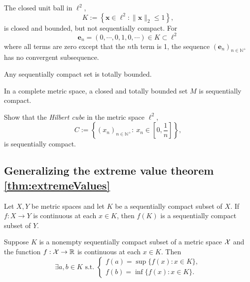 \begin{exm}
  \label{exm:closedBallInEll2}
  The closed unit ball in $\ell^2$, 
  \begin{equation}
    \label{eq:closedBallInEll2}
    K:= \left\{\mathbf{x}\in \ell^2 :
      \|\mathbf{x}\|_2 \le 1 \right\}, 
  \end{equation}
  is closed and bounded, but not sequentially compact.
  For
  \begin{displaymath}
    \mathbf{e}_n = (0,\cdots,0,1,0,\cdots)\in K \subset \ell^2
  \end{displaymath}
  where all terms are zero except that the $n$th term is 1, 
  the sequence $(\mathbf{e}_n)_{n\in \mathbb{N}^+}$
  has no convergent subsequence.
\end{exm}

\begin{lem}
  \label{lem:compactnessImpliesTotalBoundedness}
  Any sequentially compact set is totally bounded. 
\end{lem}

\begin{lem}
  \label{lem:seqCompactFromTotalBoundedness}
  In a complete metric space,
  a closed and totally bounded set $M$ is sequentially compact.
\end{lem}

\begin{exc}
  \label{exm:HilbertCube}
  Show that the \emph{Hilbert cube}
  in the metric space $\ell^2$, %
  \begin{equation}
    \label{eq:HilbertCube}
    C := \left\{
      (x_n)_{n\in \mathbb{N}^+}:\ x_n\in \left[0,\frac{1}{n}\right]
      \right\}, 
  \end{equation}
  is sequentially compact.
\end{exc}

\subsection{Generalizing
  the extreme value theorem \ref{thm:extremeValues}}
\label{sec:gener-extr-value}

\begin{lem}
  \label{lem:contFuncPreservesCompactness}
  Let $X,Y$ be metric spaces and
  let $K$ be a sequentially compact subset of $X$.
  If $f:X \rightarrow Y$ is continuous at each $x\in K$,
  then $f(K)$ is a sequentially compact subset of $Y$.
\end{lem}

\begin{thm}[Weierstrass]
  \label{thm:ExtremeValueThmGeneral}
  Suppose $K$ is a nonempty sequentially compact subset
  of a metric space ${\cal X}$
  and the function $f: {\cal X}\rightarrow \mathbb{R}$ is
  continuous at each $x\in K$.
  Then
  \begin{displaymath}
    \exists a,b\in K \text{ s.t. }
    \left\{
      \begin{array}{l}
        f(a) = \sup\{f(x): x\in K\},
        \\
        f(b) = \inf\{f(x): x\in K\}.
      \end{array}
      \right.
  \end{displaymath}
\end{thm}

